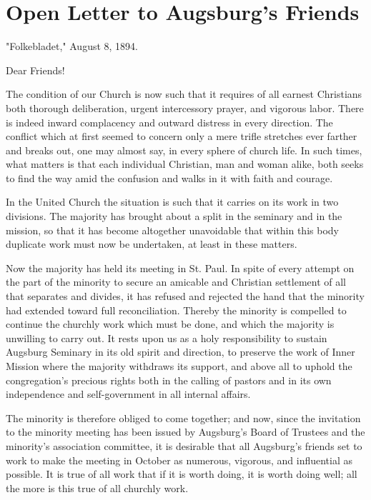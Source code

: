 

\section{Open Letter to Augsburg’s Friends}

"Folkebladet," August 8, 1894.

Dear Friends!

The condition of our Church is now such that it requires of all earnest Christians both thorough deliberation, urgent intercessory prayer, and vigorous labor. There is indeed inward complacency and outward distress in every direction. The conflict which at first seemed to concern only a mere trifle stretches ever farther and breaks out, one may almost say, in every sphere of church life. In such times, what matters is that each individual Christian, man and woman alike, both seeks to find the way amid the confusion and walks in it with faith and courage.

In the United Church the situation is such that it carries on its work in two divisions. The majority has brought about a split in the seminary and in the mission, so that it has become altogether unavoidable that within this body duplicate work must now be undertaken, at least in these matters.

Now the majority has held its meeting in St. Paul. In spite of every attempt on the part of the minority to secure an amicable and Christian settlement of all that separates and divides, it has refused and rejected the hand that the minority had extended toward full reconciliation. Thereby the minority is compelled to continue the churchly work which must be done, and which the majority is unwilling to carry out. It rests upon us as a holy responsibility to sustain Augsburg Seminary in its old spirit and direction, to preserve the work of Inner Mission where the majority withdraws its support, and above all to uphold the congregation’s precious rights both in the calling of pastors and in its own independence and self-government in all internal affairs.

The minority is therefore obliged to come together; and now, since the invitation to the minority meeting has been issued by Augsburg’s Board of Trustees and the minority’s association committee, it is desirable that all Augsburg’s friends set to work to make the meeting in October as numerous, vigorous, and influential as possible. It is true of all work that if it is worth doing, it is worth doing well; all the more is this true of all churchly work.


